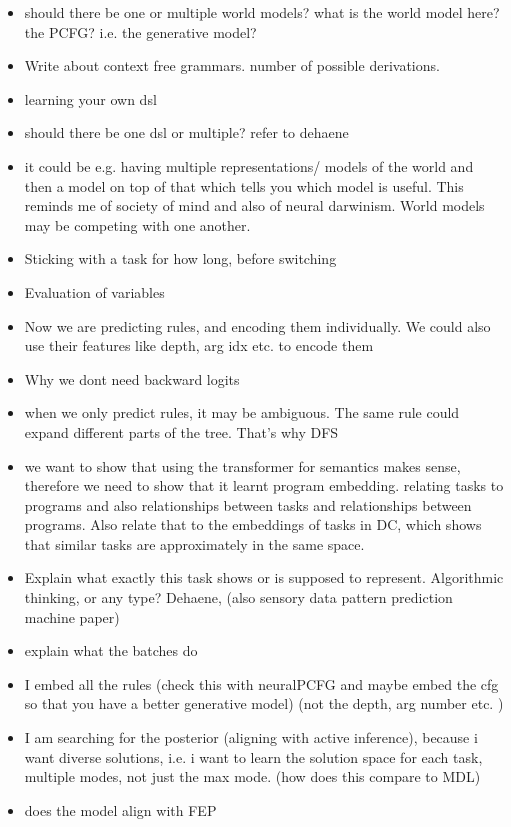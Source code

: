 \begin{itemize}
    \item should there be one or multiple world models?  what is the world model here? the PCFG? i.e. the generative model? 
    \item Write about context free grammars. number of possible derivations.
    \item learning your own dsl
    \item should there be one dsl or multiple? refer to dehaene
    \item it could be e.g. having multiple representations/ models of the world and then a model on top of that which tells you which model is useful. This reminds me of society of mind and also of neural darwinism. World models may be competing with one another. 
    \item Sticking with a task for how long, before switching
    \item Evaluation of variables
    \item Now we are predicting rules, and encoding them individually. We could also use their features like depth, arg idx etc. to encode them 
    \item Why we dont need backward logits
    \item when we only predict rules, it may be ambiguous. The same rule could expand different parts of the tree. That's why DFS
    \item we want to show that using the transformer for semantics makes sense, therefore we need to show that it learnt program embedding. relating tasks to programs and also relationships between tasks and relationships between programs. Also relate that to the embeddings of tasks in DC, which shows that similar tasks are approximately in the same space.
    \item Explain what exactly this task shows or is supposed to represent. Algorithmic thinking, or any type? Dehaene, (also sensory data pattern prediction machine paper)
    \item explain what the batches do
    \item I embed all the rules (check this with neuralPCFG and maybe embed the cfg so that you have a better generative model) (not the depth, arg number etc. )
    \item I am searching for the posterior (aligning with active inference), because i want diverse solutions, i.e. i want to learn the solution space for each task, multiple modes, not just the max mode. (how does this compare to MDL)
    \item does the model align with FEP

\end{itemize}
